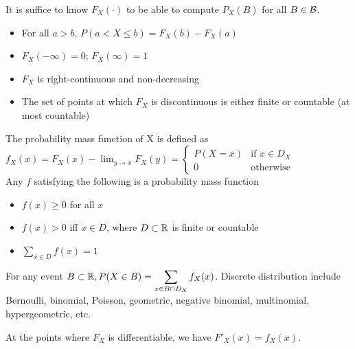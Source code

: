 \dfn[]{Distribution function of a random variable}{
    X: for all $x\in\bbR$\\

    $F_X(x) = P_X((-\infty,x]) = P(X\leq x)$
}
It is suffice to know $F_X(\cdot)$ to be able to compute $P_X(B)$ for all $B\in\mathcal{B}$.
\begin{itemize}
    \item For all $a>b$, $P(a<X\leq b) = F_X(b) - F_X(a)$
    \item $F_X(-\infty)=0$; $F_X(\infty)=1$
    \item $F_X$ is right-continuous and non-decreasing
    \item The set of points at which $F_X$ is discontinuous is either finite or countable (at most countable)
\end{itemize}

The probability mass function of X is defined as 
$\displaystyle f_X(x) = F_X(x) - \lim_{y\to x}F_X(y) = \begin{cases}
    P(X=x) & \text{if }x\in D_X\\
    0 & \text{otherwise}
\end{cases}$\\
Any $f$ satisfying the following is a probability mass function
\begin{itemize}
    \item $f(x)\geq 0$ for all $x$
    \item $f(x)>0$ iff $x\in D$, where $D\subset\mathbb{R}$ is finite or countable
    \item $\sum_{x\in D} f(x) = 1$
\end{itemize}
For any event $B\subset\mathbb{R}, P(X\in B) = \displaystyle \sum_{x\in B\cap D_X}f_X(x)$.
Discrete distribution include Bernoulli, binomial, Poisson, geometric, negative binomial, multinomial, hypergeometric, etc.

At the points where $F_X$ is differentiable, we have $F'_X(x) = f_X(x)$.\\

